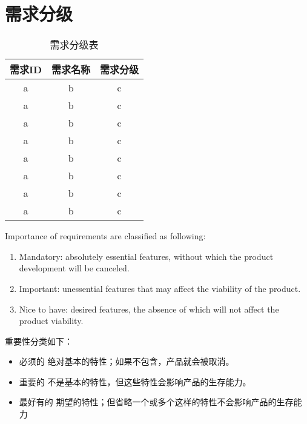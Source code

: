 \chapter{需求分级}
\begin{table}[htbp]
\centering
\caption{需求分级表} \label{tab:classification}
\begin{tabular}{|c|c|c|}
    \hline
    需求ID & 需求名称 & 需求分级 \\
    \hline
    a & b & c \\
    \hline
    a & b & c \\
    \hline
    a & b & c \\
    \hline
    a & b & c \\
    \hline
    a & b & c \\
    \hline
    a & b & c \\
    \hline
    a & b & c \\
    \hline
    a & b & c \\
    \hline
\end{tabular}
\end{table}

Importance of requirements are classified as following:
\begin{enumerate}
\item Mandatory: absolutely essential features, without which the product development will be canceled.
\item Important: unessential features that may affect the viability of the product.
\item Nice to have: desired features, the absence of which will not affect the product viability.
\end{enumerate}

重要性分类如下：
\begin{itemize}
\item 必须的		绝对基本的特性；如果不包含，产品就会被取消。
\item 重要的		不是基本的特性，但这些特性会影响产品的生存能力。
\item 最好有的		期望的特性；但省略一个或多个这样的特性不会影响产品的生存能力
\end{itemize}

